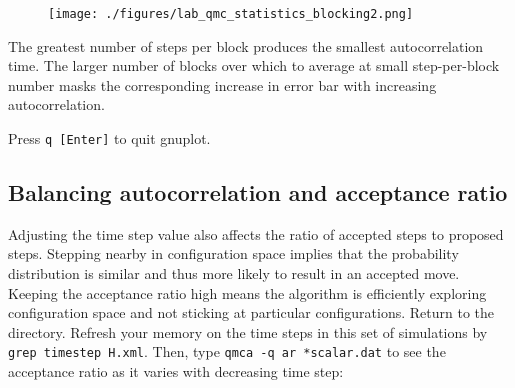 
\FloatBarrier
\begin{figure}[ht!]
\begin{center}
\texttt{[image: ./figures/lab\_qmc\_statistics\_blocking2.png]}
\end{center}
\end{figure}
\FloatBarrier


The greatest number of steps per block produces the smallest autocorrelation
time.  The larger number of blocks over which to average at small
step-per-block number masks the corresponding increase in error bar with
increasing autocorrelation.

Press \texttt{q [Enter]} to quit gnuplot.

\subsection{Balancing autocorrelation and acceptance ratio}

Adjusting the time step value also affects the ratio of accepted steps to
proposed steps.  Stepping nearby in configuration space implies that the
probability distribution is similar and thus more likely to result in an
accepted move.  Keeping the acceptance ratio high means the algorithm is
efficiently exploring configuration space and not sticking at particular
configurations.  Return to the  directory.  Refresh your
memory on the time steps in this set of simulations by \texttt{grep timestep
H.xml}. Then, type \texttt{qmca -q ar *scalar.dat} to see the acceptance ratio
as it varies with decreasing time step:

